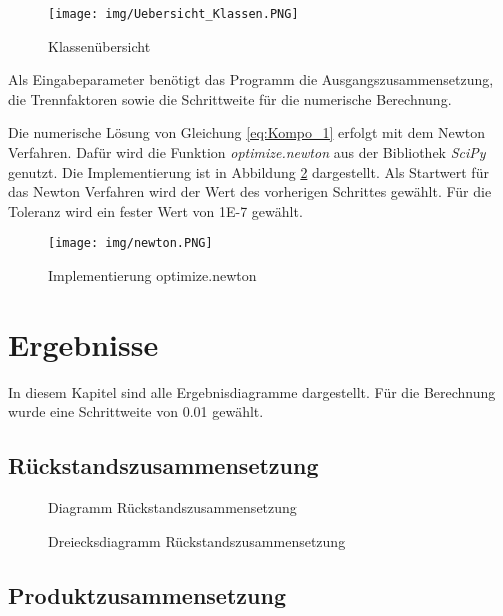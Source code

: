 \begin{figure}[h]
    \centering
    \texttt{[image: img/Uebersicht\_Klassen.PNG]}
         \caption{Klassenübersicht}
    \label{fig:Klassen}
\end{figure}

\clearpage

\noindent Als Eingabeparameter benötigt das Programm die Ausgangszusammensetzung, die Trennfaktoren sowie die Schrittweite für die numerische Berechnung.

\noindent Die numerische Lösung von Gleichung \ref{eq:Kompo_1} erfolgt mit dem Newton Verfahren. Dafür wird die Funktion \textit{optimize.newton} aus der Bibliothek \textit{SciPy} genutzt. Die Implementierung ist in Abbildung \ref{fig:Newton} dargestellt. Als Startwert für das Newton Verfahren wird der Wert des vorherigen Schrittes gewählt. Für die Toleranz wird ein fester Wert von 1E-7 gewählt.

\begin{figure}[h]
    \centering
    \texttt{[image: img/newton.PNG]}
         \caption{Implementierung optimize.newton}
    \label{fig:Newton}
\end{figure}



\clearpage

\section{Ergebnisse}
In diesem Kapitel sind alle Ergebnisdiagramme dargestellt. Für die Berechnung wurde eine Schrittweite von 0.01 gewählt.  

\subsection{Rückstandszusammensetzung}

\begin{figure}[h]
    \centering
    
        \caption{Diagramm Rückstandszusammensetzung}
    \label{fig:Trennstufe}
\end{figure}

\begin{figure}[h]
    \centering
    
        \caption{Dreiecksdiagramm Rückstandszusammensetzung}
    \label{fig:Trennstufe}
\end{figure}

\subsection{Produktzusammensetzung}

